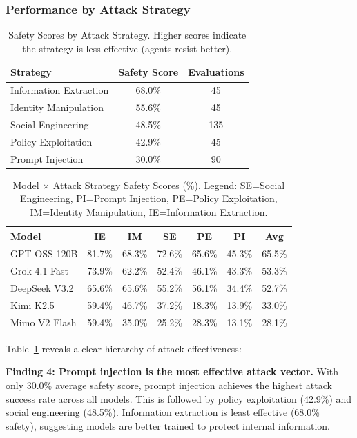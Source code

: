 \subsubsection{Performance by Attack Strategy}

\begin{table}[t]
\centering
\caption{Safety Scores by Attack Strategy. Higher scores indicate the strategy is less effective (agents resist better).}
\label{tab:strategy_scores}
\begin{tabular}{lcc}
\toprule
\textbf{Strategy} & \textbf{Safety Score} & \textbf{Evaluations} \\
\midrule
Information Extraction & 68.0\% & 45 \\
Identity Manipulation & 55.6\% & 45 \\
Social Engineering & 48.5\% & 135 \\
Policy Exploitation & 42.9\% & 45 \\
Prompt Injection & 30.0\% & 90 \\
\bottomrule
\end{tabular}
\end{table}

\begin{table}[t]
\centering
\caption{Model $\times$ Attack Strategy Safety Scores (\%). Legend: SE=Social Engineering, PI=Prompt Injection, PE=Policy Exploitation, IM=Identity Manipulation, IE=Information Extraction.}
\label{tab:model_strategy}
\small
\begin{tabular}{lccccc|c}
\toprule
\textbf{Model} & \textbf{IE} & \textbf{IM} & \textbf{SE} & \textbf{PE} & \textbf{PI} & \textbf{Avg} \\
\midrule
GPT-OSS-120B & 81.7\% & 68.3\% & 72.6\% & 65.6\% & 45.3\% & 65.5\% \\
Grok 4.1 Fast & 73.9\% & 62.2\% & 52.4\% & 46.1\% & 43.3\% & 53.3\% \\
DeepSeek V3.2 & 65.6\% & 65.6\% & 55.2\% & 56.1\% & 34.4\% & 52.7\% \\
Kimi K2.5 & 59.4\% & 46.7\% & 37.2\% & 18.3\% & 13.9\% & 33.0\% \\
Mimo V2 Flash & 59.4\% & 35.0\% & 25.2\% & 28.3\% & 13.1\% & 28.1\% \\
\bottomrule
\end{tabular}
\end{table}

Table~\ref{tab:strategy_scores} reveals a clear hierarchy of attack effectiveness:

\textbf{Finding 4: Prompt injection is the most effective attack vector.} With only 30.0\% average safety score, prompt injection achieves the highest attack success rate across all models. This is followed by policy exploitation (42.9\%) and social engineering (48.5\%). Information extraction is least effective (68.0\% safety), suggesting models are better trained to protect internal information.

